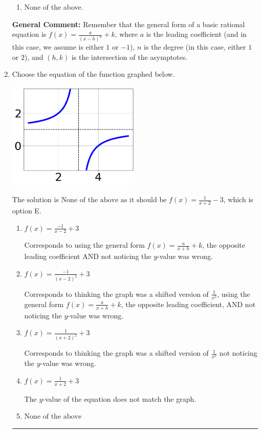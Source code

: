 \documentclass{extbook}[14pt]
\newcommand{\litem}[1]{\item #1

\rule{\textwidth}{0.4pt}}
\begin{document}
\begin{enumerate}
{\begin{enumerate}[label=\Alph*.]
\begin{multicols}{2}
\end{multicols}\item None of the above.\end{enumerate}
\textbf{General Comment:} Remember that the general form of a basic rational equation is $ f(x) = \frac{a}{(x-h)^n} + k$, where $a$ is the leading coefficient (and in this case, we assume is either $1$ or $-1$), $n$ is the degree (in this case, either $1$ or $2$), and $(h, k)$ is the intersection of the asymptotes.
}
\litem{
Choose the equation of the function graphed below.

\begin{center}
    \includegraphics[width=0.5\textwidth]{../Figures/rationalGraphToEquationCopyA.png}
\end{center}


The solution is \( \text{None of the above as it should be } f(x) = \frac{1}{x + 2} - 3 \), which is option E.\begin{enumerate}[label=\Alph*.]
\item \( f(x) = \frac{-1}{x - 2} + 3 \)

Corresponds to using the general form $f(x) = \frac{a}{x+h}+k$, the opposite leading coefficient AND not noticing the $y$-value was wrong.
\item \( f(x) = \frac{-1}{(x - 2)^2} + 3 \)

Corresponds to thinking the graph was a shifted version of $\frac{1}{x^2}$, using the general form $f(x) = \frac{a}{x+h}+k$, the opposite leading coefficient, AND not noticing the $y$-value was wrong.
\item \( f(x) = \frac{1}{(x + 2)^2} + 3 \)

Corresponds to thinking the graph was a shifted version of $\frac{1}{x^2}$ not noticing the $y$-value was wrong.
\item \( f(x) = \frac{1}{x + 2} + 3 \)

The $y$-value of the equation does not match the graph.
\item \( \text{None of the above} \)


\end{enumerate}}
\end{enumerate}
\end{document}
